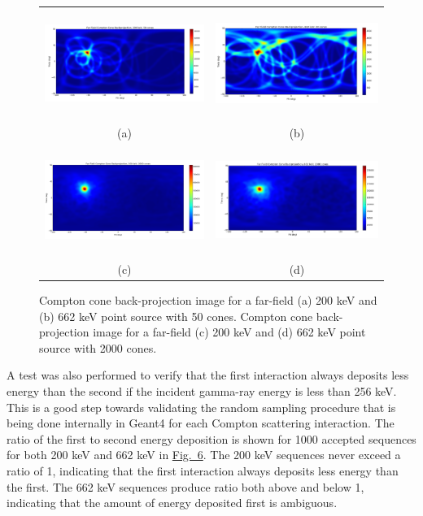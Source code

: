 \documentclass[10pt]{article}
\begin{document}
\begin{figure}[htb!]
\hypertarget{fig5}{}
\centering
\begin{tabular}{cc}
	\includegraphics[height=100pt]{Figures/Compton_200_50cones.png} & 
	\includegraphics[height=100pt]{Figures/Compton_662_50cones.png} \\ [-0.5ex]
	\scriptsize{(a)} & \scriptsize{(b)} \\ [1ex]
	\includegraphics[height=100pt]{Figures/Compton_200_2000cones.png} & 
	\includegraphics[height=100pt]{Figures/Compton_662_2000cones.png} \\ [-0.5ex]
	\scriptsize{(c)} & \scriptsize{(d)}
\end{tabular}
\caption{Compton cone back-projection image for a far-field (a) 200 keV and (b) 662 keV point source with 50 cones. Compton cone back-projection image for a far-field (c) 200 keV and (d) 662 keV point source with 2000 cones.}
\end{figure}

A test was also performed to verify that the first interaction always deposits less energy than the second if the incident gamma-ray energy is less than 256 keV. This is a good step towards validating the random sampling procedure that is being done internally in Geant4 for each Compton scattering interaction. The ratio of the first to second energy deposition is shown for 1000 accepted sequences for both 200 keV and 662 keV in \hyperlink{fig6}{Fig.~6}. The 200 keV sequences never exceed a ratio of 1, indicating that the first interaction always deposits less energy than the first. The 662 keV sequences produce ratio both above and below 1, indicating that the amount of energy deposited first is ambiguous.
\end{document}
